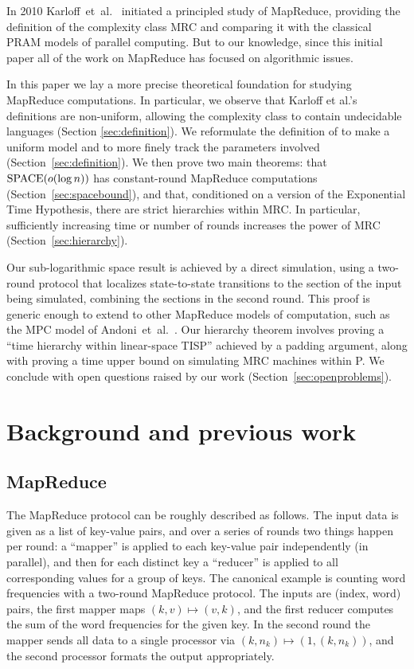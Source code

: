 \documentclass[letterpaper,USenglish]{lipics}
\theoremstyle{definition}
\theoremstyle{remark}
\newcommand{\SPACE}{\textup{SPACE}}
\newcommand{\TISP}{\textup{TISP}}
\begin{document}
In 2010 Karloff~et~al.~\cite{Karloff10} initiated a principled study of
MapReduce, providing the definition of the complexity class MRC and comparing
it with the classical PRAM models of parallel computing. But to our knowledge,
since this initial paper all of the work on MapReduce has focused on
algorithmic issues.

In this paper we lay a more precise theoretical foundation for studying
MapReduce computations. In particular, we observe that Karloff et al.'s
definitions are non-uniform, allowing the complexity class to contain
undecidable languages (Section \ref{sec:definition}). We reformulate the
definition of \cite{Karloff10} to make a uniform model and to more finely track
the parameters involved (Section~\ref{sec:definition}). We then prove two main
theorems: that $\SPACE(o(\log n))$ has constant-round MapReduce computations
(Section~\ref{sec:spacebound}), and that, conditioned on a version of the
Exponential Time Hypothesis, there are strict hierarchies within MRC.  In
particular, sufficiently increasing time or number of rounds increases the
power of MRC (Section~\ref{sec:hierarchy}).

Our sub-logarithmic space result is achieved by a direct simulation, using a
two-round protocol that localizes state-to-state transitions to the section of
the input being simulated, combining the sections in the second round. This
proof is generic enough to extend to other MapReduce models of computation,
such as the MPC model of Andoni~et~al.~\cite{AndoniNOY14}. Our hierarchy
theorem involves proving a ``time hierarchy within linear-space \TISP''
achieved by a padding argument, along with proving a time upper bound on
simulating MRC machines within P.  We conclude with open questions raised by
our work (Section~\ref{sec:openproblems}).


\section{Background and previous work}

\subsection{MapReduce}

The MapReduce protocol can be roughly described as follows. The input data is
given as a list of key-value pairs, and over a series of rounds two things
happen per round: a ``mapper'' is applied to each key-value pair independently
(in parallel), and then for each distinct key a ``reducer'' is applied to all
corresponding values for a group of keys. The canonical example is counting
word frequencies with a two-round MapReduce protocol. The inputs are (index,
word) pairs, the first mapper maps $(k,v) \mapsto (v,k)$, and the first reducer
computes the sum of the word frequencies for the given key. In the second round
the mapper sends all data to a single processor via $(k, n_k) \mapsto (1, (k,
n_k))$, and the second processor formats the output appropriately.
\end{document}
